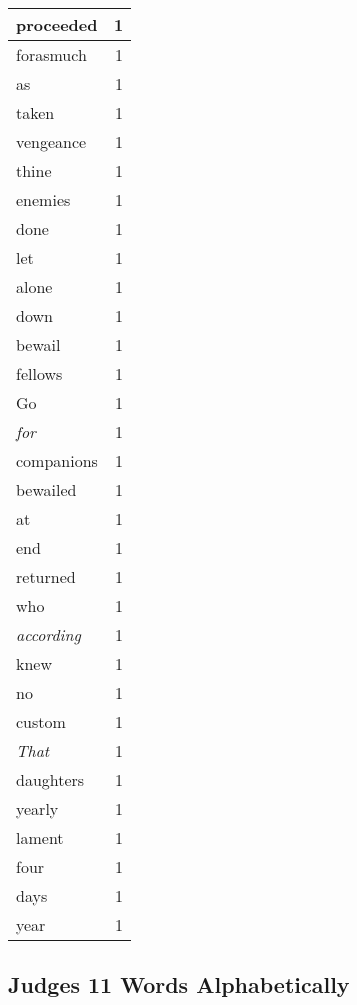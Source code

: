 \begin{center}
\begin{longtable}{l|r}
proceeded & 1\\ \hline 
forasmuch & 1\\ \hline 
as & 1\\ \hline 
taken & 1\\ \hline 
vengeance & 1\\ \hline 
thine & 1\\ \hline 
enemies & 1\\ \hline 
done & 1\\ \hline 
let & 1\\ \hline 
alone & 1\\ \hline 
down & 1\\ \hline 
bewail & 1\\ \hline 
fellows & 1\\ \hline 
Go & 1\\ \hline 
\emph{for} & 1\\ \hline 
companions & 1\\ \hline 
bewailed & 1\\ \hline 
at & 1\\ \hline 
end & 1\\ \hline 
returned & 1\\ \hline 
who & 1\\ \hline 
\emph{according} & 1\\ \hline 
knew & 1\\ \hline 
no & 1\\ \hline 
custom & 1\\ \hline 
\emph{That} & 1\\ \hline 
daughters & 1\\ \hline 
yearly & 1\\ \hline 
lament & 1\\ \hline 
four & 1\\ \hline 
days & 1\\ \hline 
year & 1\\ \hline 
\end{longtable}
\end{center}





\subsection{Judges 11 Words Alphabetically}


\normalsize
 

